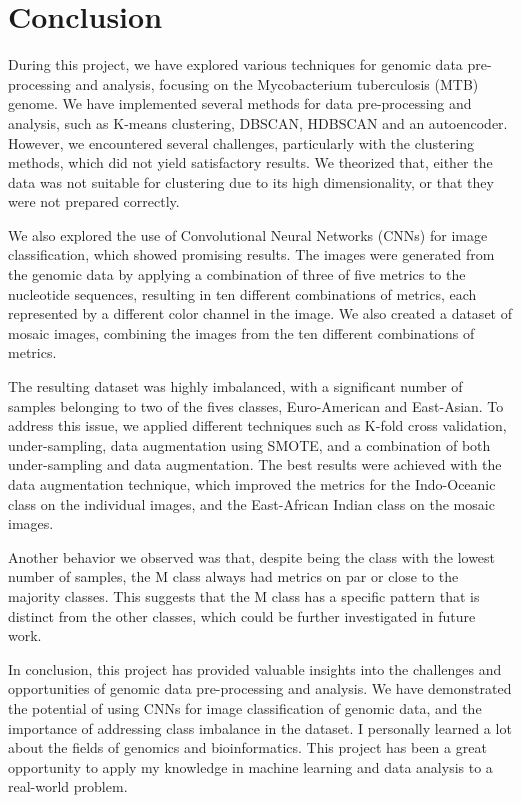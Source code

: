 \chapter{Conclusion}
\label{chap:conclusion}

During this project, we have explored various techniques for genomic data pre-processing and analysis, focusing on the Mycobacterium tuberculosis (MTB)
genome. We have implemented several methods for data pre-processing and analysis, such as K-means clustering, DBSCAN, HDBSCAN and an autoencoder.
However, we encountered several challenges, particularly with the clustering methods, which did not yield satisfactory results. We theorized that,
either the data was not suitable for clustering due to its high dimensionality, or that they were not prepared correctly.

We also explored the use of Convolutional Neural Networks (CNNs) for image classification, which showed promising results. The images were generated
from the genomic data by applying a combination of three of five metrics to the nucleotide sequences, resulting in ten different combinations of metrics,
each represented by a different color channel in the image. We also created a dataset of mosaic images, combining the images from the ten different
combinations of metrics.

The resulting dataset was highly imbalanced, with a significant number of samples belonging to two of the fives classes,
Euro-American and East-Asian. To address this issue, we applied different techniques such as K-fold cross validation, under-sampling, data augmentation
using SMOTE, and a combination of both under-sampling and data augmentation. The best results were achieved with the data augmentation technique,
which improved the metrics for the Indo-Oceanic class on the individual images, and the East-African Indian class on the mosaic images.

Another behavior we observed was that, despite being the class with the lowest number of samples, the M class always had metrics on par or close to the
majority classes. This suggests that the M class has a specific pattern that is distinct from the other classes, which could be further investigated
in future work.

In conclusion, this project has provided valuable insights into the challenges and opportunities of genomic data pre-processing and analysis.
We have demonstrated the potential of using CNNs for image classification of genomic data, and the importance of addressing class imbalance
in the dataset. I personally learned a lot about the fields of genomics and bioinformatics. This project has been a great opportunity to apply
my knowledge in machine learning and data analysis to a real-world problem.
